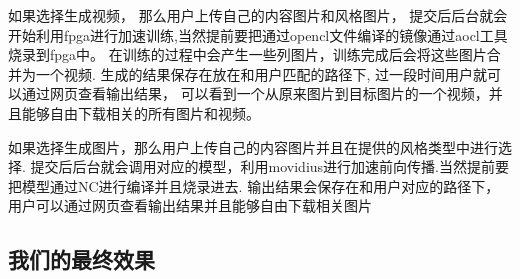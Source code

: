如果选择生成视频， 那么用户上传自己的内容图片和风格图片，
提交后后台就会开始利用fpga进行加速训练,当然提前要把通过opencl文件编译的镜像通过aocl工具烧录到fpga中。
在训练的过程中会产生一些列图片，训练完成后会将这些图片合并为一个视频.
生成的结果保存在放在和用户匹配的路径下, 过一段时间用户就可以通过网页查看输出结果，
可以看到一个从原来图片到目标图片的一个视频，并且能够自由下载相关的所有图片和视频。

如果选择生成图片，那么用户上传自己的内容图片并且在提供的风格类型中进行选择.
提交后后台就会调用对应的模型，利用movidius进行加速前向传播.当然提前要把模型通过NC进行编译并且烧录进去.
输出结果会保存在和用户对应的路径下，用户可以通过网页查看输出结果并且能够自由下载相关图片

\subsection{我们的最终效果}
